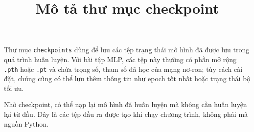 \documentclass[12pt,a4paper]{article}
\title{Mô tả thư mục checkpoint}
\date{}
\begin{document}
\maketitle

Thư mục \texttt{checkpoints} dùng để lưu các tệp trạng thái mô hình đã được lưu trong quá trình huấn luyện. Với bài tập MLP, các tệp này thường có phần mở rộng \texttt{.pth} hoặc \texttt{.pt} và chứa trọng số, tham số đã học của mạng nơ-ron; tùy cách cài đặt, chúng cũng có thể lưu thêm thông tin như epoch tốt nhất hoặc trạng thái bộ tối ưu.

Nhờ checkpoint, có thể nạp lại mô hình đã huấn luyện mà không cần huấn luyện lại từ đầu. Đây là các tệp đầu ra được tạo khi chạy chương trình, không phải mã nguồn Python.
\end{document}
